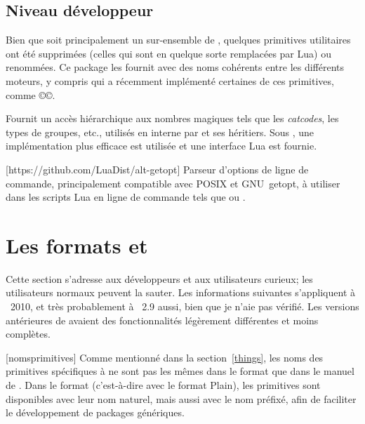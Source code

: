 \documentclass{lltxdoc}
\begin{document}
\subsection{Niveau développeur}

Bien que \luatex soit principalement un sur-ensemble de \pdftex, quelques
primitives utilitaires ont été supprimées (celles qui sont en quelque sorte
remplacées par Lua) ou renommées. Ce package les fournit avec des noms cohérents
entre les différents moteurs, y compris \xetex qui a récemment implémenté
certaines de ces primitives, comme ©\strcmp©.

Fournit un accès hiérarchique aux \og{}nombres magiques\fg{} tels que
les \emph{catcodes}, les types de groupes, etc., utilisés en interne par \tex
et ses héritiers. Sous \luatex, une implémentation plus efficace est
utilisée et une interface Lua est fournie.

\pagebreak[4]
[https://github.com/LuaDist/alt-getopt]
Parseur d'options de ligne de commande, principalement compatible avec POSIX
et GNU~getopt, à utiliser dans les scripts Lua en ligne de commande tels
que  ou .

\section{Les formats  et }\label{formats}

Cette section s'adresse aux développeurs et aux utilisateurs curieux;
les utilisateurs normaux peuvent la sauter. Les informations suivantes
s'appliquent à \texlive{}~2010, et très probablement à \miktex{}~2.9 aussi,
bien que je n'aie pas vérifié. Les versions antérieures de \texlive avaient
des fonctionnalités légèrement différentes et moins complètes.


[nomsprimitives]
Comme mentionné dans la section~\ref{things}, les noms des primitives spécifiques
à \luatex ne sont pas les mêmes dans le format  que dans le manuel
de \luatex. Dans le format  (c'est-à-dire \luatex avec le format Plain),
les primitives sont disponibles avec leur nom naturel, mais aussi avec le nom préfixé,
afin de faciliter le développement de packages génériques.
\end{document}
